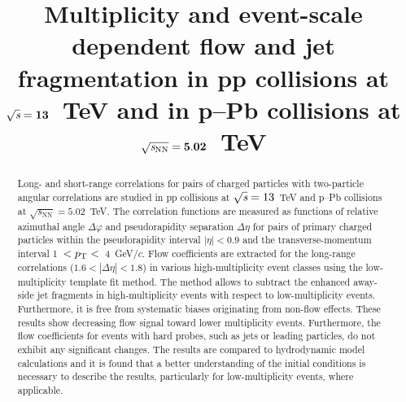 \documentclass[ALICE,manyauthors]{cernphprep}
\begin{document}
\begin{titlepage}

\PHyear{}
\PHdate{\today}
%

\title{Multiplicity and event-scale dependent flow and jet fragmentation in pp collisions at ${\sqrt{{\textit s}}}=\mathbf{13}$~TeV and in p--Pb collisions at ${\sqrt{{\textit s_\mathrm{NN}}}} = \mathbf{5.02}$~TeV}


\begin{abstract}
%
Long- and short-range correlations for pairs of charged particles with two-particle angular correlations are studied in pp collisions at ${\sqrt{{\textit s}}}=13$~TeV and p--Pb collisions at ${\sqrt{s_\mathrm{NN}}} = 5.02$~TeV. The correlation functions are measured as functions of relative azimuthal angle $\Delta\varphi$ and pseudorapidity separation $\Delta\eta$ for pairs of primary charged particles within the pseudorapidity interval $|\eta| < 0.9$ and the transverse-momentum interval 1~$ < p_\mathrm{T} < $~4~GeV/$c$.
Flow coefficients are extracted for the long-range correlations ($1.6 < |\Delta\eta| <1.8$) in various high-multiplicity event classes using the low-multiplicity template fit method. The method allows to subtract the enhanced away-side jet fragments in high-multiplicity events with respect to low-multiplicity events. Furthermore, it is free from systematic biases originating from non-flow effects. These results show decreasing flow signal toward lower multiplicity events. Furthermore, the flow coefficients for events with hard probes, such as jets or leading particles, do not exhibit any significant changes. The results are compared to hydrodynamic model calculations and it is found that a better understanding of the initial conditions is necessary to describe the results, particularly for low-multiplicity events, where applicable.





\end{abstract}

\end{titlepage}
\end{document}
